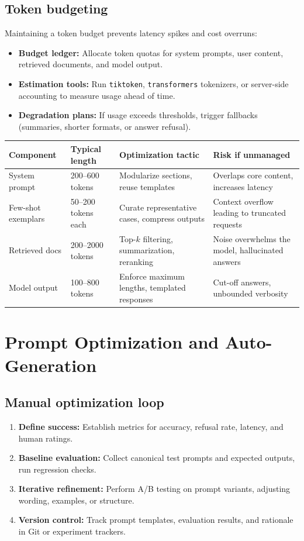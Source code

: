 \documentclass{article}
\begin{document}
\subsection{Token budgeting}
Maintaining a token budget prevents latency spikes and cost overruns:
\begin{itemize}
  \item \textbf{Budget ledger:} Allocate token quotas for system prompts, user content, retrieved documents, and model output.
  \item \textbf{Estimation tools:} Run \texttt{tiktoken}, \texttt{transformers} tokenizers, or server-side accounting to measure usage ahead of time.
  \item \textbf{Degradation plans:} If usage exceeds thresholds, trigger fallbacks (summaries, shorter formats, or answer refusal).
\end{itemize}
\begin{longtable}{p{3.2cm}p{3.2cm}p{4cm}p{4cm}}
\toprule
Component & Typical length & Optimization tactic & Risk if unmanaged \\
\midrule
System prompt & 200--600 tokens & Modularize sections, reuse templates & Overlaps core content, increases latency \\
Few-shot exemplars & 50--200 tokens each & Curate representative cases, compress outputs & Context overflow leading to truncated requests \\
Retrieved docs & 200--2000 tokens & Top-$k$ filtering, summarization, reranking & Noise overwhelms the model, hallucinated answers \\
Model output & 100--800 tokens & Enforce maximum lengths, templated responses & Cut-off answers, unbounded verbosity \\
\bottomrule
\end{longtable}

\section{Prompt Optimization and Auto-Generation}
\subsection{Manual optimization loop}
\begin{enumerate}
  \item \textbf{Define success:} Establish metrics for accuracy, refusal rate, latency, and human ratings.
  \item \textbf{Baseline evaluation:} Collect canonical test prompts and expected outputs, run regression checks.
  \item \textbf{Iterative refinement:} Perform A/B testing on prompt variants, adjusting wording, examples, or structure.
  \item \textbf{Version control:} Track prompt templates, evaluation results, and rationale in Git or experiment trackers.
\end{enumerate}
\end{document}
